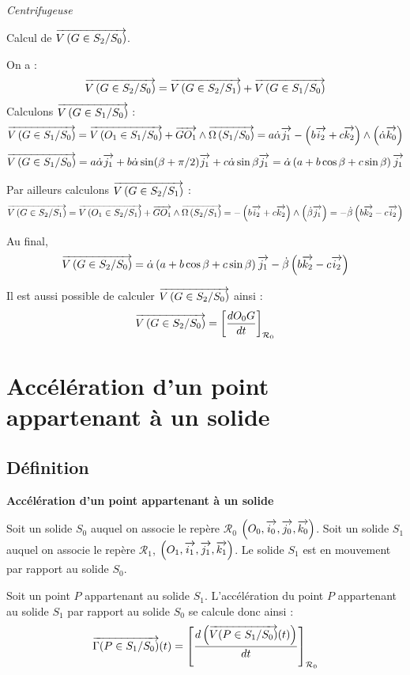 \documentclass[10pt,oneside]{article}
\begin{document}
\begin{exemple}
\textit{Centrifugeuse}

Calcul de $\overrightarrow{V\left( {G} \in {S_2}/{S_0}\right)}$.

On a : 
$$\overrightarrow{V\left( {G} \in {S_2}/{S_0}\right)} = \overrightarrow{V\left( {G} \in {S_2}/{S_1}\right)} + \overrightarrow{V\left( {G} \in {S_1}/{S_0}\right)} $$
Calculons $\overrightarrow{V\left( {G} \in {S_1}/{S_0}\right)}$ :
$$
\overrightarrow{V\left( {G} \in {S_1}/{S_0}\right)} 
= \overrightarrow{V\left( {O_1} \in {S_1}/{S_0}\right)} + \overrightarrow{GO_1}\wedge\overrightarrow{\Omega\left( {S_1}/{S_0}\right)}
= a\dot{\alpha}\overrightarrow{j_1} - \left(b\overrightarrow{i_2} + c\overrightarrow{k_2}\right) \wedge\left( \dot{\alpha} \overrightarrow{k_0}\right)
$$
$$
\overrightarrow{V\left( {G} \in {S_1}/{S_0}\right)} 
= a\dot{\alpha}\overrightarrow{j_1}  + b\dot{\alpha} \sin(\beta+\pi/2) \overrightarrow{j_1} + c \dot{\alpha}\sin\beta\overrightarrow{j_1}
= \dot{\alpha} \left(a+b \cos\beta + c \sin\beta\right) \overrightarrow{j_1} 
$$

Par ailleurs calculons $\overrightarrow{V\left( {G} \in {S_2}/{S_1}\right)}$ :
$$\overrightarrow{V\left( {G} \in {S_2}/{S_1}\right)} = \overrightarrow{V\left( {O_1} \in {S_2}/{S_1}\right)} + \overrightarrow{GO_1}\wedge \overrightarrow{\Omega\left( {S_2}/{S_1}\right)}
=-\left(b\overrightarrow{i_2}+c\overrightarrow{k_2}\right) \wedge \left(\dot{\beta}\overrightarrow{j_1}\right)
=-\dot{\beta}\left(b\overrightarrow{k_2}-c\overrightarrow{i_2} \right)
$$

Au final, 
$$\overrightarrow{V\left( {G} \in {S_2}/{S_0}\right)} = \dot{\alpha} \left(a+b \cos\beta + c \sin\beta\right) \overrightarrow{j_1} 
-\dot{\beta}\left(b\overrightarrow{k_2}-c\overrightarrow{i_2} \right)
$$

Il est aussi possible de calculer $\overrightarrow{V\left( {G} \in {S_2}/{S_0}\right)}$ ainsi : 
$$\overrightarrow{V\left( {G} \in {S_2}/{S_0}\right)} = \left[\dfrac{d O_0G}{dt}\right]_{\mathcal{R}_0}$$ 

\end{exemple}
\section{Accélération d'un point appartenant à un solide}
\subsection{Définition}
\begin{defi}
\textbf{Accélération d'un point appartenant à un solide}

Soit un solide $S_0$ auquel on associe le repère $\mathcal{R}_0$ $\left(O_0,\overrightarrow{i_0},\overrightarrow{j_0},\overrightarrow{k_0} \right)$.  Soit un solide $S_1$ auquel on associe le repère $\mathcal{R}_1$,  $\left(O_1,\overrightarrow{i_1},\overrightarrow{j_1},\overrightarrow{k_1} \right)$. Le solide $S_1$ est en mouvement par rapport au solide $S_0$. 


Soit un point $P$ appartenant au solide $S_1$. L'accélération du point $P$ appartenant au solide $S_1$ par rapport au solide $S_0$ se calcule donc ainsi : 
$$
\overrightarrow{\Gamma(P\in S_1/S_0)}(t) = \left[\dfrac{d\left( \overrightarrow{V(P\in S_1/S_0)}(t)\right)}{dt}\right]_{\mathcal{R}_0}
$$

\end{defi}
\end{document}
